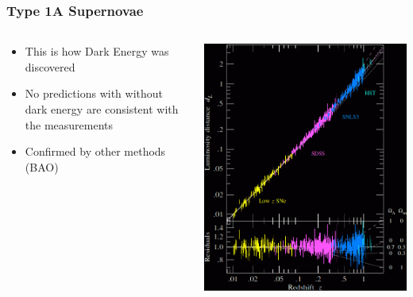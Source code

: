 \documentclass{beamer}
\begin{document}
{

    \frametitle{Type 1A Supernovae}


    \begin{columns}
        \begin{column}{0.5\textwidth}
            \begin{itemize}

                \item This is how Dark Energy was discovered 

                \item No predictions with without dark energy are consistent
                    with the measurements

                \item Confirmed by other methods (BAO)

            \end{itemize}

        \end{column}
        \begin{column}{0.5\textwidth}
            \begin{center}
                \includegraphics[width=\textwidth]{snhubblediag_betoule_inv.png}
            \end{center}
        \end{column}

    \end{columns}


}
\end{document}
